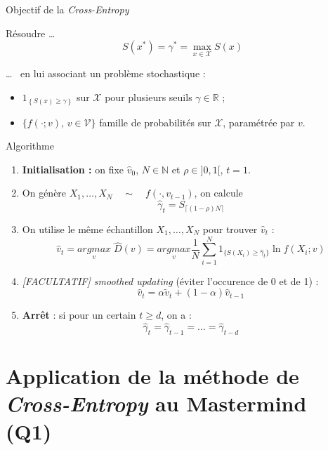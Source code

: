 \documentclass[10pt,xcolor=table,color={dvipsnames,usenames},ignorenonframetext,usepdftitle=false,french]{beamer}
\begin{document}
\begin{frame}{Objectif de la \emph{Cross-Entropy}}
\protect\hypertarget{objectif-de-la-cross-entropy}{}

Résoudre \dots  \begin{equation} 
S(x^{*})=\gamma^{*}=\underset{x\in\mathcal{X}}{{\max}} S(x)
\end{equation}

\dots ~ en lui associant un problème stochastique :

\begin{itemize}
\item $1_{\left\{ S(x)\geq\gamma\right\}}$ sur $\mathcal{X}$ pour plusieurs seuils $\gamma\in\mathbb{R}$ ;  
\item $\{f(\cdot;v),\,v\in\mathcal{V}\}$ famille de probabilités sur $\mathcal{X}$, paramétrée par $v$. 
\end{itemize}

\end{frame}

\begin{frame}{Algorithme \bcoutil}
\protect\hypertarget{algorithme}{}

\begin{enumerate}

\item<1-> \textbf{Initialisation :} on fixe  $\hat{v}_{0}$, $N\in \mathbb N$ et $\rho\in]0,1[$, $t = 1$.  
\item<2-> On génère $X_{1},\dots,X_{N} \quad  {\sim} \quad f(\cdot,v_{t-1})$, on calcule 
$$\hat{\gamma}_{t}=S_{\lceil(1-\rho)N\rceil}$$

\item<3-> On utilise le même échantillon $X_{1},\dots,X_{N}$ pour trouver $\hat{v}_{t}$ :
\begin{equation}
\hat{v}_{t}=\underset{v}{argmax}\;\hat{D}(v)=\underset{v}{argmax}\frac{1}{N}\sum_{i=1}^{N}1_{\{S(X_{i})\geq\hat{\gamma}_{t}\}}\ln f(X_{i};v)
\end{equation}
\item<5->  \emph{[FACULTATIF] smoothed updating} (éviter l'occurence de 0 et de 1) :
$$
\hat{v}_{t}=\alpha\tilde{v}_{t}+(1-\alpha)\hat{v}_{t-1}
$$
\item<4-> \textbf{Arrêt} : si pour un certain $t\geq d$,  on a : 
$$\hat{\gamma}_{t}=\hat{\gamma}_{t-1}=\dots=\hat{\gamma}_{t-d}$$
\end{enumerate}

\end{frame}

\hypertarget{sec:q1}{%
\section{\texorpdfstring{Application de la méthode de
\emph{Cross-Entropy} au Mastermind
(Q1)}{Application de la méthode de Cross-Entropy au Mastermind (Q1)}}\label{sec:q1}}
\end{document}
